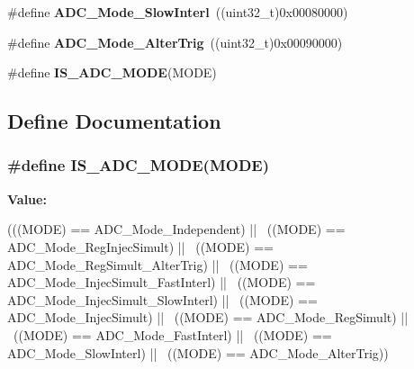 \begin{DoxyCompactItemize}
\item 
\hypertarget{group__ADC__mode_ga8b81e27e98dbc3d1e31452dbad167cd5}{
\#define {\bfseries ADC\_\-Mode\_\-SlowInterl}~((uint32\_\-t)0x00080000)}
\label{group__ADC__mode_ga8b81e27e98dbc3d1e31452dbad167cd5}

\item 
\hypertarget{group__ADC__mode_ga5595f12dc485e301ba3bad0e165586c1}{
\#define {\bfseries ADC\_\-Mode\_\-AlterTrig}~((uint32\_\-t)0x00090000)}
\label{group__ADC__mode_ga5595f12dc485e301ba3bad0e165586c1}

\item 
\#define {\bfseries IS\_\-ADC\_\-MODE}(MODE)
\end{DoxyCompactItemize}


\subsection{Define Documentation}
\hypertarget{group__ADC__mode_ga4abf4c7de28a42d7b124c9e403a6e537}{
\subsubsection[{IS\_\-ADC\_\-MODE}]{\setlength{\rightskip}{0pt plus 5cm}\#define IS\_\-ADC\_\-MODE(MODE)}}
\label{group__ADC__mode_ga4abf4c7de28a42d7b124c9e403a6e537}
{\bfseries Value:}
\begin{DoxyCode}
(((MODE) == ADC_Mode_Independent) || \
                           ((MODE) == ADC_Mode_RegInjecSimult) || \
                           ((MODE) == ADC_Mode_RegSimult_AlterTrig) || \
                           ((MODE) == ADC_Mode_InjecSimult_FastInterl) || \
                           ((MODE) == ADC_Mode_InjecSimult_SlowInterl) || \
                           ((MODE) == ADC_Mode_InjecSimult) || \
                           ((MODE) == ADC_Mode_RegSimult) || \
                           ((MODE) == ADC_Mode_FastInterl) || \
                           ((MODE) == ADC_Mode_SlowInterl) || \
                           ((MODE) == ADC_Mode_AlterTrig))
\end{DoxyCode}
